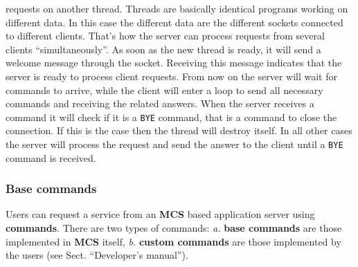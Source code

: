 \documentclass[12pt,titlepage]{article}
\newcommand{\mcs}{\textbf{MCS} }
\begin{document}
requests on another thread. Threads are basically identical programs
working on different data. In this case the different data are the
different sockets connected to different clients. That's how the server
can process requests from several clients ``simultaneously''.
%
As soon as the new thread is ready, it will send a welcome message
through the socket. Receiving this message indicates that the server
is ready to process client requests. From now on the server will wait
for commands to arrive, while the client will enter a loop to send all
necessary commands and receiving the related answers. When the server
receives a command it will check if it is a \verb|BYE| command, that is
a command to close the connection. If this is the case then the thread
will destroy itself. In all other cases the server will process the request
and send the answer to the client until a \verb|BYE| command is received.

%
\subsubsection{Base commands}
\label{sec:commands}
Users can request a service from an \mcs based application server using
\textbf{commands}. There are two types of commands: \emph{a.}
\textbf{base commands} are those implemented in \mcs itself,
\emph{b.} \textbf{custom commands} are those implemented by the users
(see Sect. ``Developer's manual'').
\end{document}
